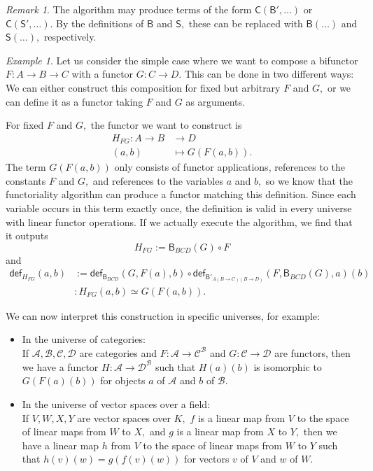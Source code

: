 \documentclass[a4paper]{article}
\theoremstyle{definition}
\theoremstyle{remark}
\newtheorem*{remark}{Remark}
\newtheorem*{example}{Example}
\renewcommand{\equiv}{\simeq}
\newcommand{\A}{\mathcal{A}}
\newcommand{\B}{\mathcal{B}}
\newcommand{\C}{\mathcal{C}}
\newcommand{\D}{\mathcal{D}}
\newcommand{\nm}{\mathsf}
\newcommand{\fndef}[1]{\nm{def}_{#1}}
\newcommand{\combinator}{\nm}
\newcommand{\compFun}{\combinator{B'}}
\newcommand{\revCompFun}{\combinator{B}}
\newcommand{\swapFun}{\combinator{C}}
\newcommand{\substFun}{\combinator{S'}}
\newcommand{\revSubstFun}{\combinator{S}}
\begin{document}
\begin{remark}
  The algorithm may produce terms of the form $\swapFun(\compFun,\ldots)$ or
  $\swapFun(\substFun,\ldots).$ By the definitions of $\revCompFun$ and $\revSubstFun,$
  these can be replaced with $\revCompFun(\ldots)$ and $\revSubstFun(\ldots),$
  respectively.
\end{remark}

\begin{example}
  Let us consider the simple case where we want to compose a bifunctor
  $F : A \to B \to C$ with a functor $G : C \to D.$ This can be done in
  two different ways: We can either construct this composition for fixed but
  arbitrary $F$ and $G,$ or we can define it as a functor taking $F$ and $G$ as
  arguments.
  
  For fixed $F$ and $G,$ the functor we want to construct is
  \begin{align*}
    H_{FG} : A \to B &\to     D\\
             (a,b)   &\mapsto G(F(a,b)).
  \end{align*}
  The term $G(F(a,b))$ only consists of functor applications, references to the
  constants $F$ and $G,$ and references to the variables $a$ and $b,$ so we
  know that the functoriality algorithm can produce a functor matching this
  definition. Since each variable occurs in this term exactly once, the
  definition is valid in every universe with linear functor operations. If we
  actually execute the algorithm, we find that it outputs
  \[H_{FG} := \revCompFun_{BCD}(G) \circ F\]
  and
  \begin{align*}
    \fndef{H_{FG}}(a,b) &:= \fndef{\revCompFun_{BCD}}(G,F(a),b) \circ \fndef{\compFun_{A(B{\to}C)(B{\to}D)}}(F,\revCompFun_{BCD}(G),a)(b)\\
                        &: H_{FG}(a,b) \equiv G(F(a,b)).
  \end{align*}

  We can now interpret this construction in specific universes, for example:
  \begin{itemize}
    \item In the universe of categories:\\
    If $\A,\B,\C,\D$ are categories and $F : \A \to \C^\B$ and $G : \C \to \D$
    are functors, then we have a functor $H : \A \to \D^\B$ such that
    $H(a)(b)$ is isomorphic to $G(F(a)(b))$ for objects $a$ of $\A$ and $b$ of
    $\B.$
    \item In the universe of vector spaces over a field:\\
    If $V,W,X,Y$ are vector spaces over $K,$ $f$ is a linear map from $V$
    to the space of linear maps from $W$ to $X,$ and $g$ is a linear map
    from $X$ to $Y,$ then we have a linear map $h$ from $V$ to the space of
    linear maps from $W$ to $Y$ such that $h(v)(w) = g(f(v)(w))$ for vectors
    $v$ of $V$ and $w$ of $W.$
  \end{itemize}


\end{example}
\end{document}
